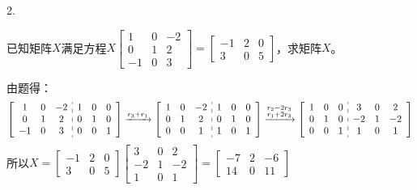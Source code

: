 \documentclass{article}
\begin{document}
2.

已知矩阵$X$满足方程$X
\begin{bmatrix}
  1 & 0 & -2 \\
  0 & 1 & 2 \\
  -1 & 0 & 3
\end{bmatrix}
=
\begin{bmatrix}
  -1 & 2 & 0 \\
  3 & 0 & 5
\end{bmatrix}$，求矩阵$X$。

\begin{jie}
由题得：
\begin{align*}
\left[
\begin{array}{c:c}
\begin{matrix}
 1 & 0 & -2 \\
  0 & 1 & 2 \\
  -1 & 0 & 3
\end{matrix} &
\begin{matrix}
  1 & 0 & 0\\
  0 & 1 & 0\\
  0 & 0 & 1
\end{matrix}
\end{array}
\right]\xrightarrow{\substack{r_{3}+r_{1}}}
{\left[
\begin{array}{c:c}
\begin{matrix}
 1 & 0 & -2 \\
  0 & 1 & 2 \\
  0 & 0 & 1
\end{matrix} &
\begin{matrix}
  1 & 0 & 0\\
  0 & 1 & 0\\
  1 & 0 & 1
\end{matrix}
\end{array}
\right]
}\xrightarrow{\substack{r_{2}-2r_{3}\\ r_{1}+2r_{3}}}
{\left[
\begin{array}{c:c}
\begin{matrix}
 1 & 0 & 0 \\
  0 & 1 & 0 \\
  0 & 0 & 1
\end{matrix} &
\begin{matrix}
  3 & 0 & 2\\
  -2 & 1 & -2\\
  1 & 0 & 1
\end{matrix}
\end{array}
\right]
}
\end{align*}
所以$X=\begin{bmatrix}
  -1 & 2 & 0 \\
  3 & 0 & 5
\end{bmatrix}\begin{bmatrix}
  3 & 0 & 2\\
  -2 & 1 & -2\\
  1 & 0 & 1
\end{bmatrix}=\begin{bmatrix}
  -7 & 2 & -6 \\
  14 & 0 & 11
\end{bmatrix}$
\end{jie}
\end{document}
